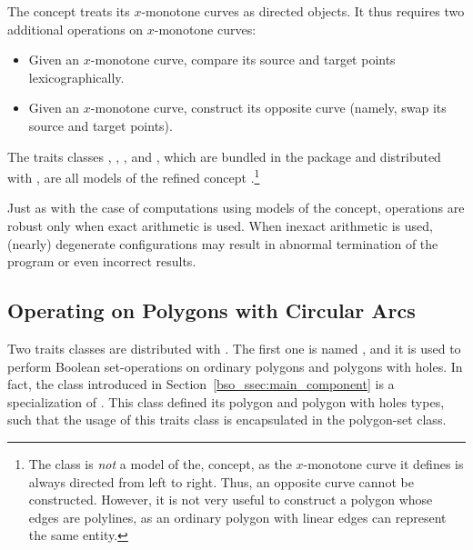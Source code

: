 The  concept treats its
$x$-monotone curves as directed objects. It thus requires two additional
operations on $x$-monotone curves:
\begin{itemize}
\item Given an $x$-monotone curve, compare its source and target points
lexicographically.
\item Given an $x$-monotone curve, construct its opposite curve (namely,
swap its source and target points).
\end{itemize}

The traits classes , 
, ,
 and , which are 
bundled in the  package and distributed with \cgal,
are all models of the refined concept 
.\footnote{The
 class is {\em not} a model of the, 
 concept, as the
$x$-monotone curve it defines is always directed from left to
right. Thus, an opposite curve cannot be constructed. However, it is
not very useful to construct a polygon whose edges are polylines, as
an ordinary polygon with linear edges can represent the same entity.}

Just as with the case of computations using models of the 
 concept, operations are robust only
when exact arithmetic is used. When inexact arithmetic is used,
(nearly) degenerate configurations may result in abnormal termination
of the program or even incorrect results.

\subsection{Operating on Polygons with Circular Arcs\label{bso_ssec:circ_seg}}

Two traits classes are distributed with \cgal. The first one is named
, and it is used to perform Boolean
set-operations on ordinary polygons and polygons with holes. In fact,
the class  introduced in
Section~\ref{bso_ssec:main_component} is a specialization of
. This class defined
its polygon and polygon with holes types, such that the usage of this
traits class is encapsulated in the polygon-set class.

